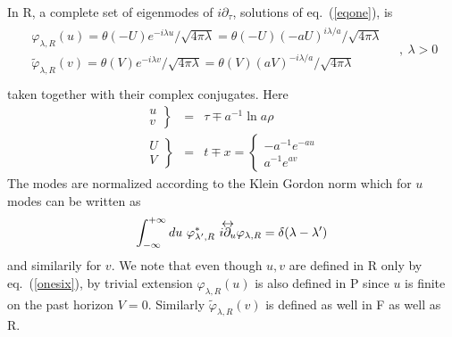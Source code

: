 \documentclass[12pt,oneside]{report}
\def\lrpartial{{\partial\kern-.75em\raise1.75ex
\hbox{$\leftrightarrow$}}\!\!}
\def\la{\lambda}
\begin{document}
In R, a complete set of eigenmodes 
of $i \partial_\tau$, solutions of eq.~(\ref{eqone}), is
\begin{eqnarray}
\begin{array}{c}
\varphi_{\la,R}(u) = \theta(-U){e^{-i \la u} /\sqrt{4 \pi \la}}
  =\theta(-U) {(-aU)^{i \la /a}   /\sqrt{4 \pi \la}}
 \\
\tilde \varphi_{\la,R} (v)= \theta(V) {e^{-i \la v} / \sqrt{4 \pi \la}}
= \theta(V) {(aV)^{-i \la /a }/\sqrt{4 \pi \la}}
\end{array}
\quad ,\ \la > 0\nonumber\\
\label{onefive}
\end{eqnarray}
taken together with their complex conjugates. Here
\begin{eqnarray}
\left.
\begin{array}{r}
u\\v
\end{array}
\right\} &=& \tau \mp a^{-1} \ln a \rho \label{onesix}\\
\left.
\begin{array}{r}
U\\V
\end{array}
\right\} &=& t \mp x = \left\{  
\begin{array}{l}
-a^{-1}e^{-au}\\a^{-1}e^{av}
\end{array}\right.
\label{onesixb}
\end{eqnarray}
The modes are normalized according to the Klein Gordon norm which for
$u$ modes can be written as
\begin{equation}
\int_{-\infty}^{+\infty} du\ 
\varphi_{\la^\prime,R}^*\  i \lrpartial_u \varphi_{\la,R}
= \delta(\la-\la^\prime)
\end{equation}
and similarily for $v$. We note that even though $u,v$ are defined 
in  R  only by eq.~(\ref{onesix}),
by trivial
extension $\varphi_{\la,R}(u)$ is also defined in P since $u$ is finite on the
past horizon $V=0$. Similarly  $\tilde \varphi_{\la,R}(v)$ is defined as well in
F as well as R. 
\end{document}
